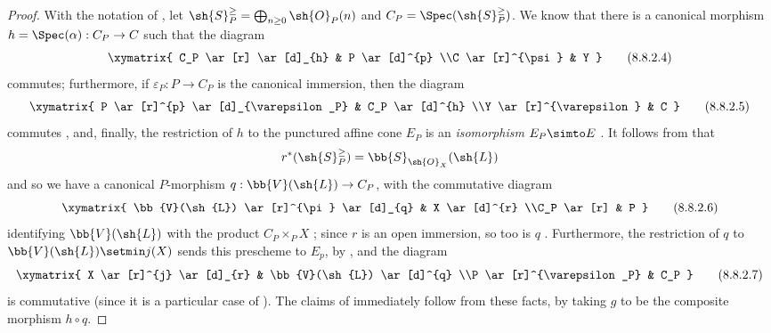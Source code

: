 \begin{proof}
With the notation of , let $\sh{S}_P^\geq = \bigoplus_{n\geq0}\sh{O}_P(n)$ and $C_P=\Spec(\sh{S}_P^\geq)$.
We know  that there is a canonical morphism $h=\Spec(\alpha):C_P\to C$ such that the diagram
\[
\label{II.8.8.2.4}
  \xymatrix{
    C_P
      \ar[r]
      \ar[d]_{h}
  & P
      \ar[d]^{p}
  \\C
      \ar[r]^{\psi}
  & Y
  }
\tag{8.8.2.4}
\]
commutes; furthermore, if $\varepsilon_P:P\to C_P$ is the canonical immersion, then the diagram
\[
\label{II.8.8.2.5}
  \xymatrix{
    P
      \ar[r]^{p}
      \ar[d]_{\varepsilon_P}
  & C_P
      \ar[d]^{h}
  \\Y
      \ar[r]^{\varepsilon}
  & C
  }
\tag{8.8.2.5}
\]
commutes , and, finally, the restriction of $h$ to the punctured affine cone $E_P$ is an \emph{isomorphism} $E_P\simto E$ .
It follows from  that
\[
  r^*(\sh{S}_P^\geq)=\bb{S}_{\sh{O}_X}(\sh{L})
\]
and so we have a canonical $P$-morphism $q:\bb{V}(\sh{L})\to C_P$, with the commutative diagram
\[
\label{II.8.8.2.6}
  \xymatrix{
    \bb{V}(\sh{L})
      \ar[r]^{\pi}
      \ar[d]_{q}
  & X
      \ar[d]^{r}
  \\C_P
      \ar[r]
  & P
  }
\tag{8.8.2.6}
\]
identifying $\bb{V}(\sh{L})$ with the product $C_P\times_P X$ ;
since $r$ is an open immersion, so too is $q$ .
Furthermore, the restriction of $q$ to $\bb{V}(\sh{L})\setmin j(X)$ sends this prescheme to $E_p$, by , and the diagram
\[
\label{II.8.8.2.7}
  \xymatrix{
    X
      \ar[r]^{j}
      \ar[d]_{r}
  & \bb{V}(\sh{L})
      \ar[d]^{q}
  \\P
      \ar[r]^{\varepsilon_P}
  & C_P
  }
\tag{8.8.2.7}
\]
is commutative (since it is a particular case of ).
The claims of  immediately follow from these facts, by taking $g$ to be the composite morphism $h\circ q$.
\end{proof}

